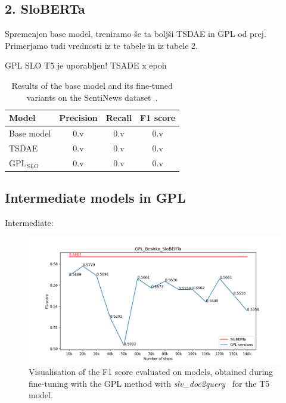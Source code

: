 \documentclass[fleqn,moreauthors,10pt]{ds_report}
\begin{document}


\subsection*{\large{2. SloBERTa}}
Spremenjen base model, treniramo še ta boljši TSDAE in GPL od prej.
Primerjamo tudi vrednosti iz te tabele in iz tabele 2.

GPL SLO T5 je uporabljen!
TSADE x epoh

\begin{table}[!h]
	\footnotesize
	\begin{center}
		\begin{tabular}{ |l|c|c|c| }
		\hline
		\rowcolor{Blue}Model & Precision & Recall & F1 score\\
		\hline

		Base model & 0.v & 0.v & 0.v\\
		TSDAE & 0.v & 0.v & 0.v\\
		$\text{GPL}_{SLO}$ & 0.v & 0.v & 0.v\\

		\hline
		\end{tabular}
	\end{center}
\caption{Results of the base model and its fine-tuned variants on the SentiNews dataset~\cite{sentiNews}.}
\label{tab4}
\end{table}



\subsection*{Intermediate models in GPL}
Intermediate:

\begin{figure}[ht]\centering
	\vspace{12 pt}
	\includegraphics[width=\linewidth]{GPL_Boshko_SloBERTa.png}
	\vspace{5 pt}
	\caption{Visualisation of the F1 score evaluated on models, obtained during fine-tuning with the GPL method with {\it slv\_doc2query}~\cite{boshko} for the T5 model.}
	\label{fig:gpl-slo-sloberta-versions}
\end{figure}
\end{document}
